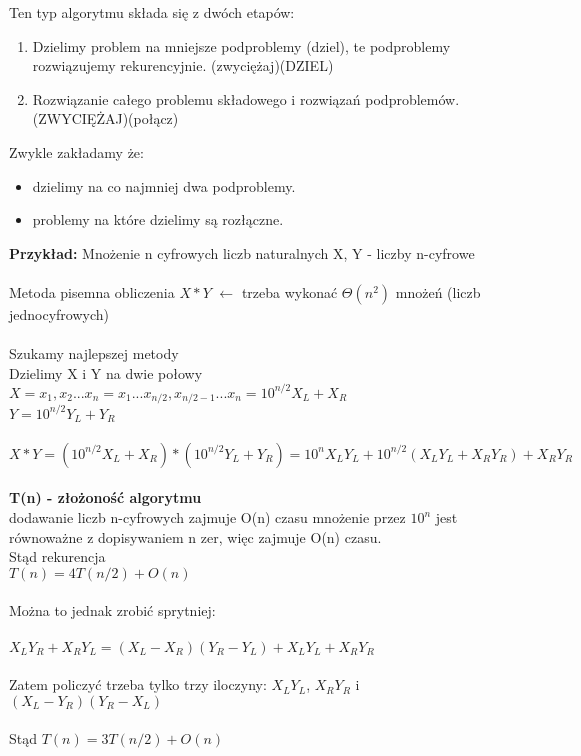 Ten typ algorytmu składa się z dwóch etapów:
\begin{enumerate}
\item Dzielimy problem na mniejsze podproblemy (dziel), te podproblemy rozwiązujemy rekurencyjnie. (zwyciężaj)(DZIEL)
\item Rozwiązanie całego problemu składowego i rozwiązań podproblemów. (ZWYCIĘŻAJ)(połącz)
\end{enumerate}
Zwykle zakładamy że:
\begin{itemize}
\item dzielimy na co najmniej dwa podproblemy.
\item problemy na które dzielimy są rozłączne.
\end{itemize}
\textbf{Przykład: }Mnożenie n cyfrowych liczb naturalnych X, Y - liczby n-cyfrowe\\
\\
Metoda pisemna obliczenia $X*Y$ $\leftarrow$ trzeba wykonać $\Theta(n^2)$ mnożeń (liczb jednocyfrowych)\\
\\
Szukamy najlepszej metody\\
Dzielimy X i Y na dwie połowy\\
$X = x_1,x_2...x_n = x_1...x_{n/2},x_{n/2-1}...x_n = 10^{n/2}X_L+X_R$\\
$Y = 10^{n/2}Y_L+Y_R$\\
\\
$X \ast Y = (10^{n/2}X_L+X_R)*(10^{n/2}Y_L+Y_R) = 10^n X_L Y_L + 10^{n/2}(X_L Y_L + X_R Y_R) + X_R Y_R $\\
\\
\textbf{T(n) - złożoność algorytmu}\\
dodawanie liczb n-cyfrowych zajmuje O(n) czasu mnożenie przez $10^n$ jest równoważne z dopisywaniem n zer, więc zajmuje O(n) czasu. \\
Stąd rekurencja\\
$T(n) = 4T(n/2) + O(n)$\\
\\
Można to jednak zrobić sprytniej:\\
\\
$X_L Y_R + X_R Y_L = (X_L - X_R)(Y_R - Y_L) + X_L Y_L + X_R Y_R$\\
\\
Zatem policzyć trzeba tylko trzy iloczyny: $X_L Y_L$, $X_R Y_R$ i $(X_L - Y_R)(Y_R - X_L)$\\
\\
Stąd $T(n) = 3T(n/2) + O(n)$